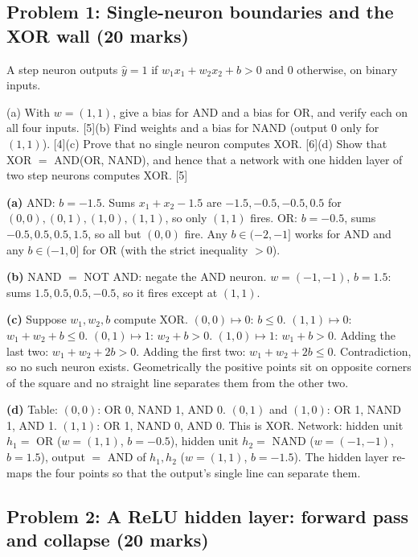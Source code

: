 \documentclass[11pt]{article}
\begin{document}
\subsection{Problem 1: Single-neuron boundaries and the XOR wall \normalfont\small\color{GreyN}(20 marks)}

\begin{prob}A step neuron outputs $\hat y=1$ if $w_1x_1+w_2x_2+b>0$ and $0$ otherwise, on binary inputs.

(a) With $w=(1,1)$, give a bias for AND and a bias for OR, and verify each on all four inputs. [5]\newline (b) Find weights and a bias for NAND (output 0 only for $(1,1)$). [4]\newline (c) Prove that no single neuron computes XOR. [6]\newline (d) Show that XOR $=$ AND(OR, NAND), and hence that a network with one hidden layer of two step neurons computes XOR. [5]\end{prob}

\begin{soln}\textbf{(a)} AND: $b=-1.5$. Sums $x_1+x_2-1.5$ are $-1.5,-0.5,-0.5,0.5$ for $(0,0),(0,1),(1,0),(1,1)$, so only $(1,1)$ fires. OR: $b=-0.5$, sums $-0.5,0.5,0.5,1.5$, so all but $(0,0)$ fire. Any $b\in(-2,-1]$ works for AND and any $b\in(-1,0]$ for OR (with the strict inequality $>0$).

\textbf{(b)} NAND $=$ NOT AND: negate the AND neuron. $w=(-1,-1)$, $b=1.5$: sums $1.5,0.5,0.5,-0.5$, so it fires except at $(1,1)$.

\textbf{(c)} Suppose $w_1,w_2,b$ compute XOR. $(0,0)\mapsto0$: $b\le0$. $(1,1)\mapsto0$: $w_1+w_2+b\le0$. $(0,1)\mapsto1$: $w_2+b>0$. $(1,0)\mapsto1$: $w_1+b>0$. Adding the last two: $w_1+w_2+2b>0$. Adding the first two: $w_1+w_2+2b\le0$. Contradiction, so no such neuron exists. Geometrically the positive points sit on opposite corners of the square and no straight line separates them from the other two.

\textbf{(d)} Table: $(0,0)$: OR 0, NAND 1, AND 0. $(0,1)$ and $(1,0)$: OR 1, NAND 1, AND 1. $(1,1)$: OR 1, NAND 0, AND 0. This is XOR. Network: hidden unit $h_1=$ OR ($w=(1,1)$, $b=-0.5$), hidden unit $h_2=$ NAND ($w=(-1,-1)$, $b=1.5$), output $=$ AND of $h_1,h_2$ ($w=(1,1)$, $b=-1.5$). The hidden layer re-maps the four points so that the output's single line can separate them.\end{soln}

\subsection{Problem 2: A ReLU hidden layer: forward pass and collapse \normalfont\small\color{GreyN}(20 marks)}
\end{document}
